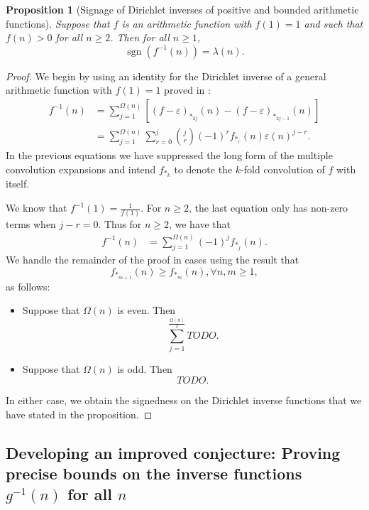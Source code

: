 \documentclass[11pt,reqno,a4letter]{article}
\numberwithin{figure}{section}
\numberwithin{table}{section}
\theoremstyle{plain}
\newtheorem{prop}[theorem]{Proposition}
\numberwithin{theorem}{section}
\theoremstyle{definition}
\begin{document}
\begin{prop}[Signage of Dirichlet inverses of positive and bounded arithmetic functions] 
\label{prop_SignageDirInvsOfPosBddArithmeticFuncs_v1} 
Suppose that $f$ is an arithmetic function with $f(1) = 1$ and such that $f(n) > 0$ 
for all $n \geq 2$. Then for all $n \geq 1$, 
\[
\operatorname{sgn}\left(f^{-1}(n)\right) = \lambda(n). 
\]
\end{prop} 
\begin{proof} 
We begin by using an identity for the 
Dirichlet inverse of a general arithmetic function with $f(1) = 1$ proved in 
\cite{MERCA-SCHMIDT-RAMJ,MOUSAVI-SCHMIDT-2019}: 
\begin{align*} 
f^{-1}(n) & = \sum_{j=1}^{\Omega(n)} \left[(f-\varepsilon)_{\ast_{2j}}(n) - 
    (f-\varepsilon)_{\ast_{2j-1}}(n)\right] \\ 
     & = \sum_{j=1}^{\Omega(n)} \sum_{r=0}^{j} \binom{j}{r} (-1)^{r} f_{\ast_r}(n) \varepsilon(n)^{j-r}. 
\end{align*} 
In the previous equations we have suppressed the long form of the multiple convolution expansions and 
intend $f_{\ast_k}$ to denote the $k$-fold convolution of $f$ with itself. 

We know that $f^{-1}(1) = \frac{1}{f(1)}$. For $n \geq 2$, the last equation only has non-zero terms 
when $j-r = 0$. Thus for $n \geq 2$, we have that 
\begin{align*} 
f^{-1}(n) & = \sum_{j=1}^{\Omega(n)} (-1)^{j} f_{\ast_j}(n). 
\end{align*} 
We handle the remainder of the proof in cases using the result that 
\[
f_{\ast_{m+1}}(n) \geq f_{\ast_{m}}(n), \forall n, m \geq 1, 
\]
as follows: 
\begin{itemize} 
     \item Suppose that $\Omega(n)$ is even. Then 
     \[
     \sum_{j=1}^{\frac{\Omega(n)}{2}} TODO. 
     \]
     \item Suppose that $\Omega(n)$ is odd. Then 
     \[
     TODO. 
     \]
\end{itemize} 
In either case, we obtain the signedness on the Dirichlet inverse functions that we have 
stated in the proposition. 
\end{proof} 

\subsection{Developing an improved conjecture: 
            Proving precise bounds on the inverse functions $g^{-1}(n)$ for all $n$} 
\end{document}
